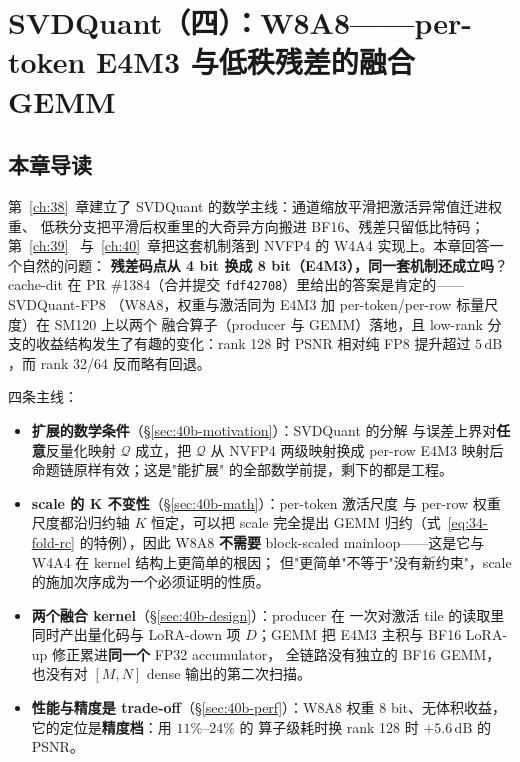 \chapter{SVDQuant（四）：W8A8——per-token E4M3 与低秩残差的融合 GEMM}\label{ch:40b}

\section{本章导读}

第~\ref{ch:38}~章建立了 SVDQuant 的数学主线：通道缩放平滑把激活异常值迁进权重、
低秩分支把平滑后权重里的大奇异方向搬进 BF16、残差只留低比特码；第~\ref{ch:39}~
与~\ref{ch:40}~章把这套机制落到 NVFP4 的 W4A4 实现上。本章回答一个自然的问题：
\textbf{残差码点从 4 bit 换成 8 bit（E4M3），同一套机制还成立吗}？cache-dit 在
PR \#1384（合并提交 \texttt{fdf42708}）里给出的答案是肯定的——SVDQuant-FP8
（W8A8，权重与激活同为 E4M3 加 per-token/per-row 标量尺度）在 SM120 上以两个
融合算子（producer 与 GEMM）落地，且 low-rank 分支的收益结构发生了有趣的变化：rank 128
时 PSNR 相对纯 FP8 提升超过 $5\,\mathrm{dB}$，而 rank 32/64 反而略有回退。

四条主线：

\begin{itemize}[itemsep=1pt,topsep=2pt]
  \item \textbf{扩展的数学条件}（\S\ref{sec:40b-motivation}）：SVDQuant 的分解
        与误差上界对\textbf{任意}反量化映射 $\mathcal Q$ 成立，把 $\mathcal Q$
        从 NVFP4 两级映射换成 per-row E4M3 映射后命题链原样有效；这是"能扩展"
        的全部数学前提，剩下的都是工程。
  \item \textbf{scale 的 K 不变性}（\S\ref{sec:40b-math}）：per-token 激活尺度
        与 per-row 权重尺度都沿归约轴 $K$ 恒定，可以把 scale 完全提出 GEMM
        归约（式~\ref{eq:34-fold-rc} 的特例），因此 W8A8 \textbf{不需要}
        block-scaled mainloop——这是它与 W4A4 在 kernel 结构上更简单的根因；
        但"更简单"不等于"没有新约束"，scale 的施加次序成为一个必须证明的性质。
  \item \textbf{两个融合 kernel}（\S\ref{sec:40b-design}）：producer 在
        一次对激活 tile 的读取里同时产出量化码与 LoRA-down 项 $D$；GEMM 把
        E4M3 主积与 BF16 LoRA-up 修正累进\textbf{同一个} FP32 accumulator，
        全链路没有独立的 BF16 GEMM，也没有对 $[M,N]$ dense 输出的第二次扫描。
  \item \textbf{性能与精度是 trade-off}（\S\ref{sec:40b-perf}）：W8A8 权重
        8 bit、无体积收益，它的定位是\textbf{精度档}：用 $11\%$--$24\%$ 的
        算子级耗时换 rank 128 时 $+5.6\,\mathrm{dB}$ 的 PSNR。
\end{itemize}

